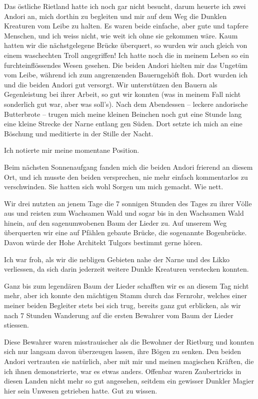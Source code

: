 \documentclass[10pt, a4paper, oneside]{book}
\begin{document}
Das östliche Rietland hatte ich noch gar nicht besucht, darum heuerte ich zwei Andori an, mich dorthin zu begleiten und mir auf dem Weg die Dunklen Kreaturen vom Leibe zu halten. Es waren beide einfache, aber gute und tapfere Menschen, und ich weiss nicht, wie weit ich ohne sie gekommen wäre. Kaum hatten wir die nächstgelegene Brücke überquert, so wurden wir auch gleich von einem waschechten Troll angegriffen! Ich hatte noch die in meinem Leben so ein furchteinflössendes Wesen gesehen. Die beiden Andori hielten mir das Ungetüm vom Leibe, während ich zum angrenzenden Bauerngehöft floh. Dort wurden ich und die beiden Andori gut versorgt. Wir unterstützen den Bauern als Gegenleistung bei ihrer Arbeit, so gut wir konnten (was in meinem Fall nicht sonderlich gut war, aber was soll’s). Nach dem Abendessen – leckere andorische Butterbrote – trugen mich meine kleinen Beinchen noch gut eine Stunde lang eine kleine Strecke der Narne entlang gen Süden. Dort setzte ich mich an eine Böschung und meditierte in der Stille der Nacht.

Ich notierte mir meine momentane Position.\bigskip



Beim nächsten Sonnenaufgang fanden mich die beiden Andori frierend an diesem Ort, und ich musste den beiden versprechen, nie mehr einfach kommentarlos zu verschwinden. Sie hatten sich wohl Sorgen um mich gemacht. Wie nett.

Wir drei nutzten an jenem Tage die 7 sonnigen Stunden des Tages zu ihrer Völle aus und reisten zum Wachsamen Wald und sogar bis in den Wachsamen Wald hinein, auf den sagenumwobenen Baum der Lieder zu. Auf unserem Weg überquerten wir eine auf Pfählen gebaute Brücke, die sogenannte Bogenbrücke. Davon würde der Hohe Architekt Tulgors bestimmt gerne hören.

Ich war froh, als wir die nebligen Gebieten nahe der Narne und des Likko verliessen, da sich darin jederzeit weitere Dunkle Kreaturen verstecken konnten.

Ganz bis zum legendären Baum der Lieder schafften wir es an diesem Tag nicht mehr, aber ich konnte den mächtigen Stamm durch das Fernrohr, welches einer meiner beiden Begleiter stets bei sich trug, bereits ganz gut erblicken, als wir nach 7 Stunden Wanderung auf die ersten Bewahrer vom Baum der Lieder stiessen.

Diese Bewahrer waren misstrauischer als die Bewohner der Rietburg und konnten sich nur langsam davon überzeugen lassen, ihre Bögen zu senken. Den beiden Andori vertrauten sie natürlich, aber mit mir und meinen magischen Kräften, die ich ihnen demonstrierte, war es etwas anders. Offenbar waren Zaubertricks in diesen Landen nicht mehr so gut angesehen, seitdem ein gewisser Dunkler Magier hier sein Unwesen getrieben hatte. Gut zu wissen.
\end{document}
